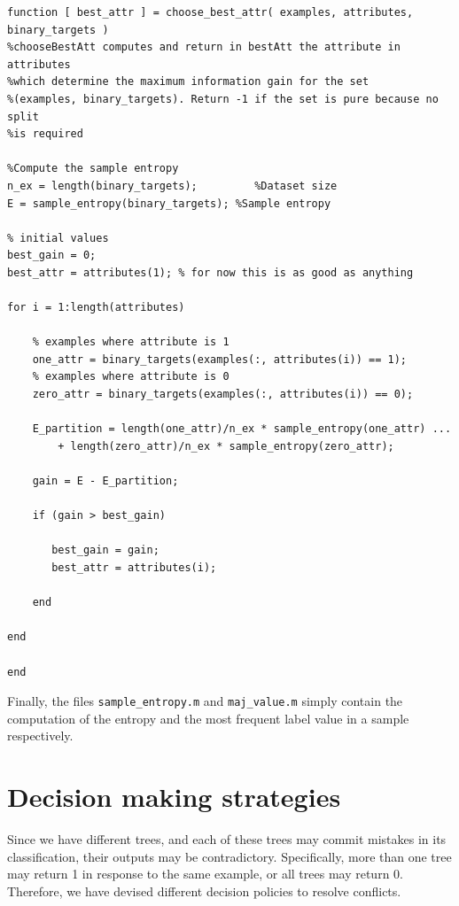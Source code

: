 \documentclass{article}
\begin{document}
\begin{lstlisting}
function [ best_attr ] = choose_best_attr( examples, attributes, binary_targets )
%chooseBestAtt computes and return in bestAtt the attribute in attributes
%which determine the maximum information gain for the set 
%(examples, binary_targets). Return -1 if the set is pure because no split
%is required

%Compute the sample entropy
n_ex = length(binary_targets);         %Dataset size
E = sample_entropy(binary_targets); %Sample entropy

% initial values
best_gain = 0;
best_attr = attributes(1); % for now this is as good as anything
    
for i = 1:length(attributes)
       
    % examples where attribute is 1
    one_attr = binary_targets(examples(:, attributes(i)) == 1); 
    % examples where attribute is 0
    zero_attr = binary_targets(examples(:, attributes(i)) == 0);
        
    E_partition = length(one_attr)/n_ex * sample_entropy(one_attr) ...
        + length(zero_attr)/n_ex * sample_entropy(zero_attr);
        
    gain = E - E_partition;
        
    if (gain > best_gain)
            
       best_gain = gain;
       best_attr = attributes(i);
        
    end
        
end

end

\end{lstlisting}
Finally, the files \verb$sample_entropy.m$ and \verb$maj_value.m$ simply contain the computation of the entropy and the most frequent label value in a sample respectively.

\section{Decision making strategies}
Since we have different trees, and each of these trees may commit mistakes in its classification, their outputs may be contradictory. Specifically, more than one tree may return 1 in response to the same example, or all trees may return 0. Therefore, we have devised different decision policies to resolve conflicts.
\end{document}
